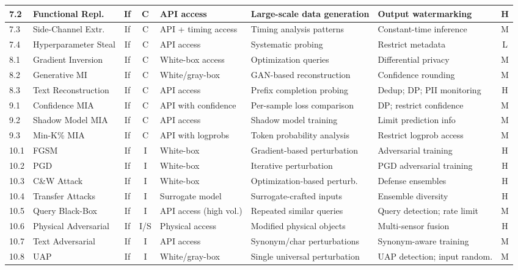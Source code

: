 \documentclass[conference]{IEEEtran}
\begin{document}
{\begin{longtable}{p{0.7cm}p{1.5cm}ccp{1.6cm}p{1.5cm}p{1.6cm}c}
\midrule
7.2 & Functional Repl. & If & C & API access & Large-scale data generation & Output watermarking & H \\
\midrule
7.3 & Side-Channel Extr. & If & C & API + timing access & Timing analysis patterns & Constant-time inference & M \\
\midrule
7.4 & Hyperparameter Steal & If & C & API access & Systematic probing & Restrict metadata & L \\
\midrule
8.1 & Gradient Inversion & If & C & White-box access & Optimization queries & Differential privacy & M \\
\midrule
8.2 & Generative MI & If & C & White/gray-box & GAN-based reconstruction & Confidence rounding & M \\
\midrule
8.3 & Text Reconstruction & If & C & API access & Prefix completion probing & Dedup; DP; PII monitoring & H \\
\midrule
9.1 & Confidence MIA & If & C & API with confidence & Per-sample loss comparison & DP; restrict confidence & M \\
\midrule
9.2 & Shadow Model MIA & If & C & API access & Shadow model training & Limit prediction info & M \\
\midrule
9.3 & Min-K\% MIA & If & C & API with logprobs & Token probability analysis & Restrict logprob access & M \\
\midrule
10.1 & FGSM & If & I & White-box & Gradient-based perturbation & Adversarial training & H \\
\midrule
10.2 & PGD & If & I & White-box & Iterative perturbation & PGD adversarial training & H \\
\midrule
10.3 & C\&W Attack & If & I & White-box & Optimization-based perturb. & Defense ensembles & H \\
\midrule
10.4 & Transfer Attacks & If & I & Surrogate model & Surrogate-crafted inputs & Ensemble diversity & H \\
\midrule
10.5 & Query Black-Box & If & I & API access (high vol.) & Repeated similar queries & Query detection; rate limit & M \\
\midrule
10.6 & Physical Adversarial & If & I/S & Physical access & Modified physical objects & Multi-sensor fusion & H \\
\midrule
10.7 & Text Adversarial & If & I & API access & Synonym/char perturbations & Synonym-aware training & M \\
\midrule
10.8 & UAP & If & I & White/gray-box & Single universal perturbation & UAP detection; input random. & M \\

\end{longtable}}
\end{document}
